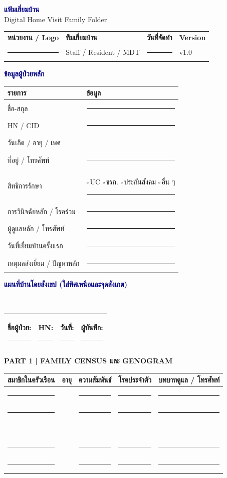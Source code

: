 \documentclass[12pt,a4paper]{article}
\newcommand{\cb}{\(\square\)\,}
\newlength{\blanklen}
\newcommand{\blank}[1][4cm]{\setlength{\blanklen}{#1}\ifdim\blanklen>2cm\setlength{\blanklen}{2cm}\fi\rule{\blanklen}{0.4pt}}
\newcommand{\patientline}{\begin{tabularx}{\textwidth}{|X|X|X|X|}\hline ชื่อผู้ป่วย: \blank[2.8cm] & HN: \blank[1.4cm] & วันที่: \blank[1.4cm] & ผู้บันทึก: \blank[1.5cm]\\\hline\end{tabularx}\vspace{3pt}}
\newcommand{\sectiontitle}[1]{\vspace{4pt}\begin{tcolorbox}[colback=navy,colframe=navy,boxrule=0pt,arc=1pt,left=5pt,right=5pt,top=3pt,bottom=3pt]\color{white}\large\textbf{#1}\end{tcolorbox}}
\newcommand{\sub}[1]{\par\vspace{3pt}\noindent\textcolor{navy}{\large\textbf{#1}}\par\vspace{1pt}}
\newcommand{\lines}[1]{\begin{tcolorbox}[colback=white,colframe=gray!55,boxrule=0.4pt,arc=1pt,height=#1]\ \end{tcolorbox}}
\begin{document}
\begin{center}\vspace*{0.6cm}\Huge\textcolor{navy}{\textbf{แฟ้มเยี่ยมบ้าน}}\\[3pt]\Large Digital Home Visit Family Folder\end{center}
\begin{tcolorbox}[colback=bluegray,colframe=navy,boxrule=0.6pt]\begin{tabularx}{\textwidth}{XXXX}\textbf{หน่วยงาน / Logo} & \textbf{ทีมเยี่ยมบ้าน} & \textbf{วันที่จัดทำ} & \textbf{Version}\\\blank[3cm] & Staff / Resident / MDT & \blank[2cm] & v1.0\end{tabularx}\end{tcolorbox}
\sub{ข้อมูลผู้ป่วยหลัก}
\begin{tabularx}{\textwidth}{|p{}|X|}\hline\rowcolor{navy}\color{white}\textbf{รายการ}&\color{white}\textbf{ข้อมูล}\\\hline
ชื่อ-สกุล & \blank[11cm]\\\hline HN / CID & \blank[11cm]\\\hline วันเกิด / อายุ / เพศ & \blank[11cm]\\\hline ที่อยู่ / โทรศัพท์ & \blank[11cm]\\\hline สิทธิการรักษา & \cb UC \cb ขรก. \cb ประกันสังคม \cb อื่น ๆ \blank[3cm]\\\hline การวินิจฉัยหลัก / โรคร่วม & \blank[11cm]\\\hline ผู้ดูแลหลัก / โทรศัพท์ & \blank[11cm]\\\hline วันที่เยี่ยมบ้านครั้งแรก & \blank[11cm]\\\hline เหตุผลส่งเยี่ยม / ปัญหาหลัก & \blank[11cm]\\\hline\end{tabularx}
\sub{แผนที่บ้านโดยสังเขป (ใส่ทิศเหนือและจุดสังเกต)}\lines{6.0cm}
\newpage\patientline\sectiontitle{PART 1 | FAMILY CENSUS และ GENOGRAM}
\begin{tabularx}{\textwidth}{|X|c|X|X|X|}\hline\rowcolor{navy}\color{white}สมาชิกในครัวเรือน&\color{white}อายุ&\color{white}ความสัมพันธ์&\color{white}โรคประจำตัว&\color{white}บทบาทดูแล / โทรศัพท์\\\hline
\blank[3.8cm]& &\blank[2.2cm]&\blank[2.5cm]&\blank[3cm]\\\hline \blank[3.8cm]& &\blank[2.2cm]&\blank[2.5cm]&\blank[3cm]\\\hline \blank[3.8cm]& &\blank[2.2cm]&\blank[2.5cm]&\blank[3cm]\\\hline \blank[3.8cm]& &\blank[2.2cm]&\blank[2.5cm]&\blank[3cm]\\\hline \blank[3.8cm]& &\blank[2.2cm]&\blank[2.5cm]&\blank[3cm]\\\hline\end{tabularx}
\end{document}
